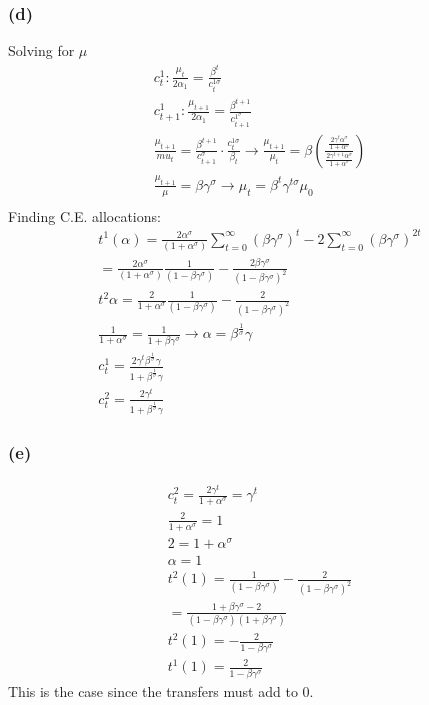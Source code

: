 \documentclass[10pt, a4paper]{article}
\begin{document}
    \subsubsection*{(d)}
      Solving for $\mu$
      \begin{gather*}
        c_t^1: \frac{\mu_t}{2\alpha_1} = \frac{\beta^t}{c_t^{1\sigma}} \\
        c_{t+1}^1: \frac{\mu_{t+1}}{2\alpha_1} = \frac{\beta^{t+1}}{c_{t+1}^{1^{\sigma}}} \\
        \frac{\mu_{t+1}}{mu_t} = \frac{\beta^{t+1}}{c_{t+1}^{\sigma}}\cdot\frac{c_t^{1\sigma}}{\beta_t} \rightarrow \frac{\mu_{t+1}}{\mu_t} = \beta(\frac{\frac{2\gamma^t\alpha^{\sigma}}{1+\alpha^{\sigma}}}{\frac{2\gamma^{t+1}\alpha^{\sigma}}{1+\alpha^{\sigma}}}) \\
        \frac{\mu_{t+1}}{\mu} = \beta\gamma^{\sigma} \rightarrow \mu_t = \beta^t\gamma^{t\sigma}\mu_0 \\
      \end{gather*}
      Finding C.E. allocations:
      \begin{gather*}
        t^1(\alpha) = \frac{2\alpha^{\sigma}}{(1+\alpha^{\sigma})}\sum\limits_{t=0}^{\infty}(\beta\gamma^{\sigma})^t - 2\sum\limits_{t=0}^{\infty}(\beta\gamma^{\sigma})^{2t} \\
        = \frac{2\alpha^{\sigma}}{(1+\alpha^{\sigma})}\frac{1}{(1-\beta\gamma^{\sigma})} - \frac{2\beta\gamma^{\sigma}}{(1-\beta\gamma^{\sigma})^2} \\
        t^2{\alpha} = \frac{2}{1+\alpha^{\sigma}}\frac{1}{(1-\beta\gamma^{\sigma})} - \frac{2}{(1-\beta\gamma^{\sigma})^2} \\
        \frac{1}{1+\alpha^{\sigma}} = \frac{1}{1+\beta\gamma^{\sigma}} \rightarrow \alpha = \beta^{\frac{1}{\sigma}}\gamma \\
        \boxed{c^1_t = \frac{2\gamma^t\beta^{\frac{1}{\sigma}}\gamma}{1+\beta^{\frac{1}{\sigma}}\gamma}} \\
        \boxed{c_t^2 = \frac{2\gamma^t}{1+\beta^{\frac{1}{\sigma}}\gamma}}
      \end{gather*}
    \subsubsection*{(e)}
      \begin{gather*}
        c_t^2 = \frac{2\gamma^t}{1+\alpha^{\sigma}} = \gamma^t \\
        \frac{2}{1+\alpha^{\sigma}} = 1 \\
        2 = 1+\alpha^{\sigma} \\
        \alpha = 1 \\
        t^2(1) = \frac{1}{(1-\beta\gamma^{\sigma})} - \frac{2}{(1-\beta\gamma^{\sigma})^2} \\
         = \frac{1+\beta\gamma^{\sigma}-2}{(1-\beta\gamma^{\sigma})(1+\beta\gamma^{\sigma})} \\
        \boxed{t^2(1)= -\frac{2}{1-\beta\gamma^{\sigma}}} \\
        \boxed{t^1(1) = \frac{2}{1-\beta\gamma^{\sigma}}}
      \end{gather*}
      This is the case since the transfers must add to 0.
\end{document}
